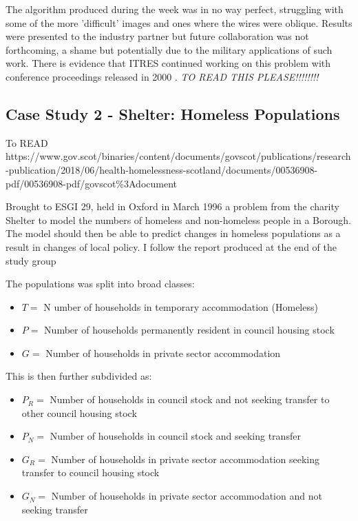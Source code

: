 \documentclass[11pt]{article} %
\begin{document}
	The algorithm produced during the week was in no way perfect, struggling with some of the more 'difficult' images and ones where the wires were oblique. Results were presented to the industry partner but future collaboration was not forthcoming, a shame but potentially due to the military applications of such work. There is evidence that ITRES continued working on this problem with conference proceedings released in 2000 \cite{Babey}. \emph{TO READ THIS PLEASE!!!!!!!!}
	

	
	
	\subsection{Case Study 2 - Shelter: Homeless Populations \label{homeless}}
	
To READ https://www.gov.scot/binaries/content/documents/govscot/publications/research-publication/2018/06/health-homelessness-scotland/documents/00536908-pdf/00536908-pdf/govscot\%3Adocument
	
   Brought to ESGI 29, held in Oxford in March 1996 a problem from the charity Shelter to model the numbers of homeless and non-homeless people in a Borough. The model should then be able to predict changes in homeless populations as a result in changes of local policy. I follow the report produced at the end of the study group \cite{Shelter1996}
	
	The populations was split into broad classes: 
	\begin{itemize}
		\item $ T= $ N umber of households in temporary accommodation (Homeless)
		\item $  P= $ Number of households permanently resident in council housing stock
		\item $ G= $ Number of households in private sector accommodation 
	\end{itemize}
	This is then further subdivided as:
	\begin{itemize}
		\item $ P_R= $ Number of households in council stock and not  seeking transfer to other council housing stock 
		\item $ P_N= $ Number of households in council stock and seeking transfer 
		\item $ G_R= $ Number of households in private sector accommodation seeking transfer to council housing stock 
		\item $ G_N= $ Number of households in private sector accommodation and not seeking transfer
	\end{itemize}
\end{document}
